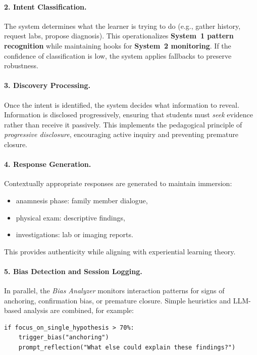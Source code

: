 \paragraph{2. Intent Classification.}
The system determines what the learner is trying to do (e.g., gather history,
request labs, propose diagnosis). This operationalizes \textbf{System~1 pattern
recognition} while maintaining hooks for \textbf{System~2 monitoring}. If the
confidence of classification is low, the system applies fallbacks to preserve
robustness.

\paragraph{3. Discovery Processing.}
Once the intent is identified, the system decides what information to reveal.
Information is disclosed progressively, ensuring that students must \emph{seek}
evidence rather than receive it passively. This implements the pedagogical principle
of \emph{progressive disclosure}, encouraging active inquiry and preventing premature
closure.

\paragraph{4. Response Generation.}
Contextually appropriate responses are generated to maintain immersion:
\begin{itemize}
    \item anamnesis phase: family member dialogue,
    \item physical exam: descriptive findings,
    \item investigations: lab or imaging reports.
\end{itemize}
This provides authenticity while aligning with experiential learning theory.

\paragraph{5. Bias Detection and Session Logging.}
In parallel, the \emph{Bias Analyzer} monitors interaction patterns for signs of
anchoring, confirmation bias, or premature closure. Simple heuristics and LLM-based
analysis are combined, for example:

\begin{verbatim}
if focus_on_single_hypothesis > 70%:
    trigger_bias("anchoring")
    prompt_reflection("What else could explain these findings?")
\end{verbatim}

